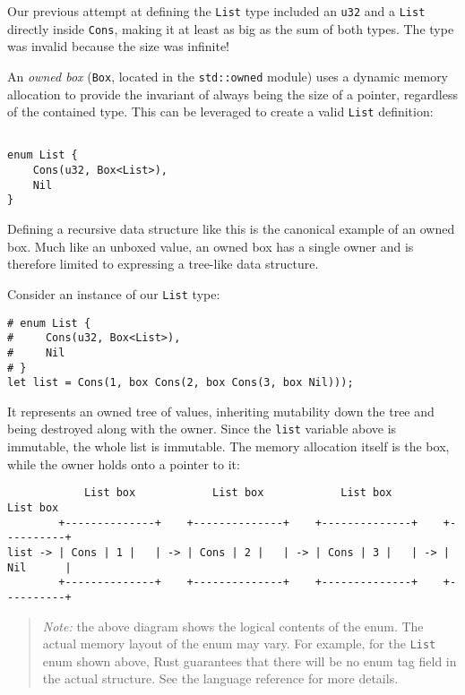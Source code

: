 \documentclass[]{article}
\begin{document}
Our previous attempt at defining the \texttt{List} type included an
\texttt{u32} and a \texttt{List} directly inside \texttt{Cons}, making
it at least as big as the sum of both types. The type was invalid
because the size was infinite!

An \emph{owned box} (\texttt{Box}, located in the \texttt{std::owned}
module) uses a dynamic memory allocation to provide the invariant of
always being the size of a pointer, regardless of the contained type.
This can be leveraged to create a valid \texttt{List} definition:

\begin{verbatim}

enum List {
    Cons(u32, Box<List>),
    Nil
}
\end{verbatim}

Defining a recursive data structure like this is the canonical example
of an owned box. Much like an unboxed value, an owned box has a single
owner and is therefore limited to expressing a tree-like data structure.

Consider an instance of our \texttt{List} type:

\begin{verbatim}
# enum List {
#     Cons(u32, Box<List>),
#     Nil
# }
let list = Cons(1, box Cons(2, box Cons(3, box Nil)));
\end{verbatim}

It represents an owned tree of values, inheriting mutability down the
tree and being destroyed along with the owner. Since the \texttt{list}
variable above is immutable, the whole list is immutable. The memory
allocation itself is the box, while the owner holds onto a pointer to
it:

\begin{verbatim}
            List box            List box            List box          List box
        +--------------+    +--------------+    +--------------+    +----------+
list -> | Cons | 1 |   | -> | Cons | 2 |   | -> | Cons | 3 |   | -> | Nil      |
        +--------------+    +--------------+    +--------------+    +----------+
\end{verbatim}

\begin{quote}
\emph{Note:} the above diagram shows the logical contents of the enum.
The actual memory layout of the enum may vary. For example, for the
\texttt{List} enum shown above, Rust guarantees that there will be no
enum tag field in the actual structure. See the language reference for
more details.
\end{quote}
\end{document}
